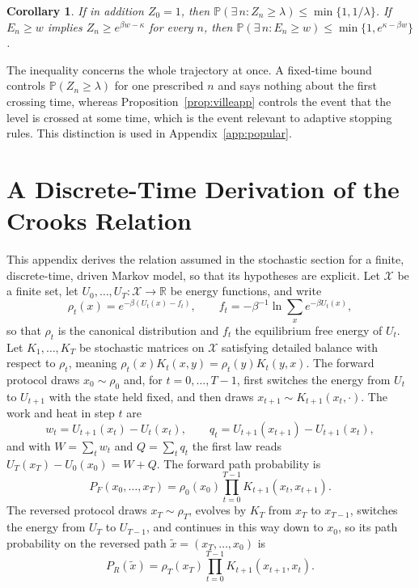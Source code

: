 \documentclass[11pt]{article}
\newtheorem{corollary}{Corollary}
\theoremstyle{definition}
\theoremstyle{remark}
\renewcommand{\Pr}{\mathbb{P}}
\begin{document}
\begin{corollary}\label{cor:villeone}
If in addition $Z_0 = 1$, then $\Pr(\exists\, n : Z_n \ge \lambda) \le \min\{1, 1/\lambda\}$. If $E_n \ge w$ implies $Z_n \ge e^{\beta w - \kappa}$ for every $n$, then $\Pr(\exists\, n : E_n \ge w) \le \min\{1, e^{\kappa - \beta w}\}$.
\end{corollary}

The inequality concerns the whole trajectory at once. A fixed-time bound controls $\Pr(Z_n \ge \lambda)$ for one prescribed $n$ and says nothing about the first crossing time, whereas Proposition~\ref{prop:villeapp} controls the event that the level is crossed at some time, which is the event relevant to adaptive stopping rules. This distinction is used in Appendix~\ref{app:popular}.

\section{A Discrete-Time Derivation of the Crooks Relation}\label{app:crooks}

This appendix derives the relation assumed in the stochastic section for a finite, discrete-time, driven Markov model, so that its hypotheses are explicit. Let $\mathcal{X}$ be a finite set, let $U_0, \dots, U_T : \mathcal{X} \to \mathbb{R}$ be energy functions, and write
\[
\rho_t(x) = e^{-\beta (U_t(x) - f_t)}, \qquad f_t = -\beta^{-1} \ln \sum_{x} e^{-\beta U_t(x)},
\]
so that $\rho_t$ is the canonical distribution and $f_t$ the equilibrium free energy of $U_t$. Let $K_1, \dots, K_T$ be stochastic matrices on $\mathcal{X}$ satisfying detailed balance with respect to $\rho_t$, meaning $\rho_t(x) K_t(x,y) = \rho_t(y) K_t(y,x)$. The forward protocol draws $x_0 \sim \rho_0$ and, for $t = 0, \dots, T-1$, first switches the energy from $U_t$ to $U_{t+1}$ with the state held fixed, and then draws $x_{t+1} \sim K_{t+1}(x_t, \cdot)$. The work and heat in step $t$ are
\[
w_t = U_{t+1}(x_t) - U_t(x_t), \qquad q_t = U_{t+1}(x_{t+1}) - U_{t+1}(x_t),
\]
and with $W = \sum_t w_t$ and $Q = \sum_t q_t$ the first law reads $U_T(x_T) - U_0(x_0) = W + Q$. The forward path probability is
\[
P_F(x_0, \dots, x_T) = \rho_0(x_0) \prod_{t=0}^{T-1} K_{t+1}(x_t, x_{t+1}).
\]
The reversed protocol draws $x_T \sim \rho_T$, evolves by $K_T$ from $x_T$ to $x_{T-1}$, switches the energy from $U_T$ to $U_{T-1}$, and continues in this way down to $x_0$, so its path probability on the reversed path $\tilde{x} = (x_T, \dots, x_0)$ is
\[
P_R(\tilde{x}) = \rho_T(x_T) \prod_{t=0}^{T-1} K_{t+1}(x_{t+1}, x_t).
\]
\end{document}

